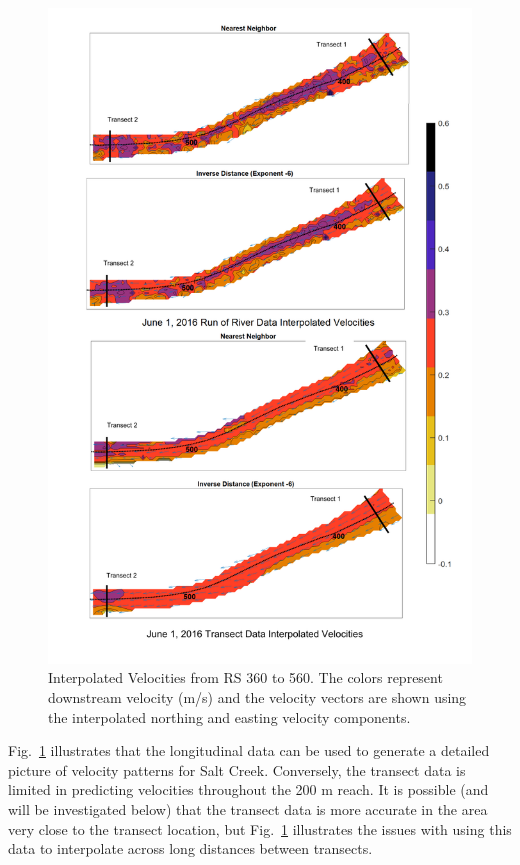 \documentclass[Journal,letterpaper,BackFigs]{ascelike-new}
\begin{document}
\begin{figure}
\centering
\includegraphics[width=5.3in]{Results360_560.pdf}
\caption{Interpolated Velocities from RS 360 to 560. The colors represent downstream velocity (m/s) and the velocity vectors are shown using the interpolated northing and easting velocity components.}
\label{fig:Results360_560}
\end{figure}

Fig.~\ref{fig:Results360_560} illustrates that the longitudinal data can be used to generate a detailed picture of velocity patterns for Salt Creek. Conversely, the transect data is limited in predicting velocities throughout the 200 m reach. It is possible (and will be investigated below) that the transect data is more accurate in the area very close to the transect location, but Fig.~\ref{fig:Results360_560} illustrates the issues with using this data to interpolate across long distances between transects.
\end{document}
